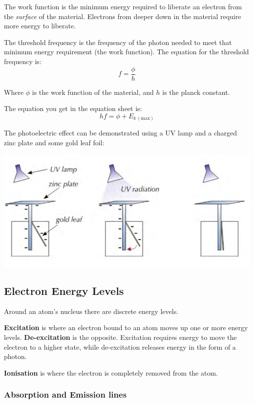 \documentclass[a4paper, 12pt]{article}
\begin{document}
The work function is the minimum energy required to liberate an electron from the \textit{surface} of the material. Electrons from deeper down in the material require more energy to liberate.

The threshold frequency is the frequency of the photon needed to meet that minimum energy requirement (the work function). The equation for the threshold frequency is:
$$
f = \frac{\phi}{h}
$$

Where $\phi$ is the work function of the material, and $h$ is the planck constant.

The equation you get in the equation sheet is:
$$
hf = \phi + E_{k \, (\text{max})}
$$

The photoelectric effect can be demonstrated using a UV lamp and a charged zinc plate and some gold leaf foil:

\begin{center}
\includegraphics[width=\textwidth]{images/photoelecExp.png}
\end{center}

\newpage
\subsection{Electron Energy Levels}

Around an atom's nucleus there are discrete energy levels.

\textbf{Excitation} is where an electron bound to an atom moves up one or more energy levels. \textbf{De-excitation} is the opposite. Excitation requires energy to move the electron to a higher state, while de-excitation releases energy in the form of a photon.

\textbf{Ionisation} is where the electron is completely removed from the atom.

\subsubsection{Absorption and Emission lines}
\end{document}
